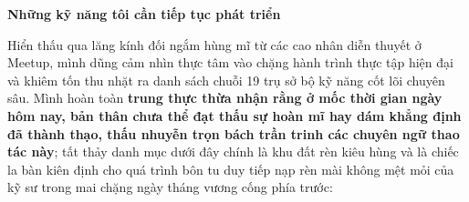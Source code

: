 \vspace{0.5em}\noindent\textbf{Những kỹ năng tôi cần tiếp tục phát
triển}\par

Hiển thấu qua lăng kính đối ngắm hùng mĩ từ các cao nhân diễn thuyết ở
Meetup, mình dũng cảm nhìn thực tâm vào chặng hành trình thực tập hiện
đại và khiêm tốn thu nhặt ra danh sách chuỗi 19 trụ sở bộ kỹ năng cốt
lõi chuyên sâu. Mình hoàn toàn \textbf{trung thực thừa nhận rằng ở mốc
thời gian ngày hôm nay, bản thân chưa thể đạt thấu sự hoàn mĩ hay dám
khẳng định đã thành thạo, thấu nhuyễn trọn bách trần trinh các chuyên
ngữ thao tác này}; tất thảy danh mục dưới đây chính là khu đất rèn kiêu
hùng và là chiếc la bàn kiên định cho quá trình bôn tu duy tiếp nạp rèn
mài không mệt mỏi của kỹ sư trong mai chặng ngày tháng vương cống phía
trước:

